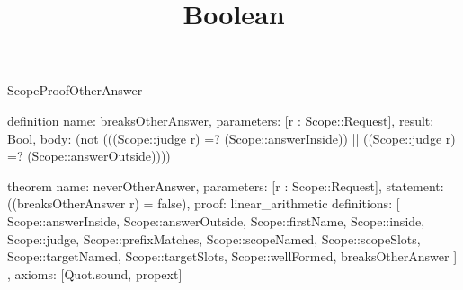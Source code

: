 \begin{lexlean}{ScopeProofOtherAnswer}
\title{Boolean}
\begin{semanticmodule}
definition{
  name: breaksOtherAnswer,
  parameters: [r : Scope::Request],
  result: Bool,
  body: (not (((Scope::judge r) =? (Scope::answerInside)) || ((Scope::judge r) =? (Scope::answerOutside))))
}

theorem{
  name: neverOtherAnswer,
  parameters: [r : Scope::Request],
  statement: ((breaksOtherAnswer r) = false),
  proof: linear_arithmetic{
    definitions: [
      Scope::answerInside,
      Scope::answerOutside,
      Scope::firstName,
      Scope::inside,
      Scope::judge,
      Scope::prefixMatches,
      Scope::scopeNamed,
      Scope::scopeSlots,
      Scope::targetNamed,
      Scope::targetSlots,
      Scope::wellFormed,
      breaksOtherAnswer
    ]
  },
  axioms: [Quot.sound, propext]
}
\end{semanticmodule}
\end{lexlean}
